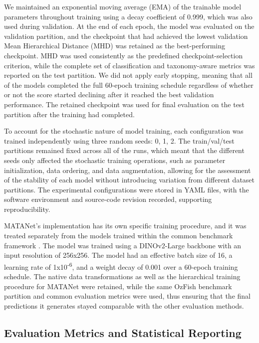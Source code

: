 \documentclass[preprint,12pt]{elsarticle}
\begin{document}
We maintained an exponential moving average (EMA) of the trainable model
parameters throughout training using a decay coefficient of 0.999, which
was also used during validation. At the end of each epoch, the model was
evaluated on the validation partition, and the checkpoint that had
achieved the lowest validation Mean Hierarchical Distance (MHD)
\citep{ref24,ref30} was retained as the best-performing
checkpoint. MHD was used consistently as the predefined
checkpoint-selection criterion, while the complete set of classification
and taxonomy-aware metrics was reported on the test partition. We did
not apply early stopping, meaning that all of the models completed the
full 60-epoch training schedule regardless of whether or not the score
started declining after it reached the best validation performance. The
retained checkpoint was used for final evaluation on the test partition
after the training had completed.

To account for the stochastic nature of model training, each
configuration was trained independently using three random seeds: 0, 1,
2. The train/val/test partitions remained fixed across all of the runs,
which meant that the different seeds only affected the stochastic
training operations, such as parameter initialization, data ordering,
and data augmentation, allowing for the assessment of the stability of
each model without introducing variation from different dataset
partitions. The experimental configurations were stored in YAML files,
with the software environment and source-code revision recorded,
supporting reproducibility.

MATANet's implementation has its own specific training procedure, and it
was treated separately from the models trained within the common
benchmark framework \citep{ref26}. The model was
trained using a DINOv2-Large backbone
\citep{ref47} with an input resolution of
256x256. The model had an effective batch size of 16, a learning rate of
1x10\textsuperscript{-6}, and a weight decay of 0.001 over a 60-epoch
training schedule. The native data transformations as well as the
hierarchical training procedure for MATANet were retained, while the
same OzFish benchmark partition and common evaluation metrics were used,
thus ensuring that the final predictions it generates stayed comparable
with the other evaluation methods.

\subsection{Evaluation Metrics and Statistical
Reporting}\label{evaluation-metrics-and-statistical-reporting}
\end{document}
